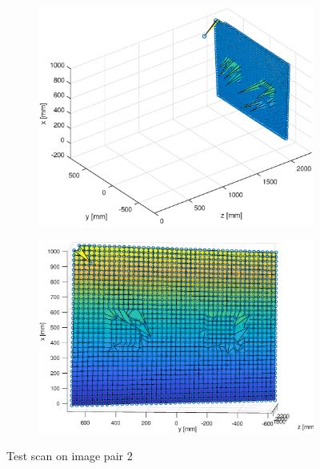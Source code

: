 \begin{figure}[h!]
\begin{subfigure}[t]{0.35\linewidth}
	\end{subfigure}
	\begin{subfigure}[t]{0.45\linewidth}
		\centering
		\includegraphics[width=1\linewidth]{figures/part2/test2_scan}
	\end{subfigure}
	\begin{subfigure}[t]{0.45\linewidth}
		\centering
		\includegraphics[width=1\linewidth]{figures/part2/test2_scan1}
	\end{subfigure}
	\caption{Test scan on image pair 2}
\end{figure}
